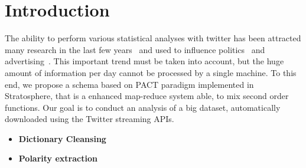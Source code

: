\section{Introduction}
\label{sec:introduction}

The ability to perform various statistical analyses with twitter has been attracted many research in the last few years~\cite{Hong:2012qy,Lehmann:2012kx} and used to influence politics~\cite{Tumasjan:2010vn} and advertising~\cite{Bakshy:2011ys}. 
This important trend must be taken into account, but the huge amount of information per day cannot be processed by a single machine. 
To this end, we propose a schema based on PACT paradigm implemented in Stratosphere, that is a enhanced map-reduce system able, to mix second order functions. 
Our goal is to conduct an analysis of a big dataset, automatically downloaded using the Twitter streaming APIs. 


\begin{itemize}

\item \textbf{Dictionary Cleansing}
\item \textbf{Polarity extraction}

\end{itemize}
